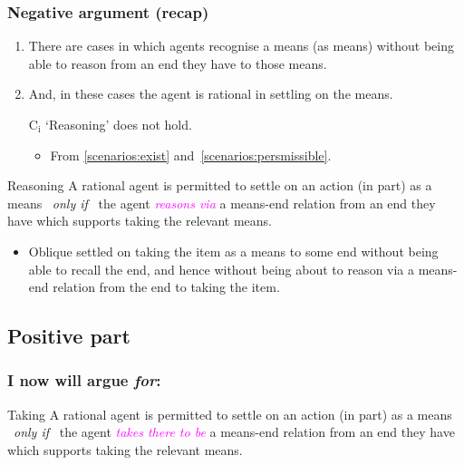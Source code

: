 \documentclass[noamssymb,
]{beamer} %
\newcommand{\hand}{\ding{43}}
\newcommand{\hozlinedash}[0]{
  \noindent\hdashrule[0.5ex][c]{\textwidth}{.1pt}{2.5pt}
}
\begin{document}
\begin{frame}
  \frametitle{Negative argument (recap)}

  \begin{enumerate}
  \item There are cases in which agents recognise a means (as means) without being able to reason from an end they have to those means.
  \item And, in these cases the agent is rational in settling on the means.

  \item[C\(_{\text{i}}\)] `Reasoning' does not hold.
    \begin{itemize}
    \item From \ref{scenarios:exist} and~\ref{scenarios:persmissible}.
    \end{itemize}
  \end{enumerate}

  \hozlinedash
  {\footnotesize
    \begin{block}{Reasoning}
      A rational agent is permitted to settle on an action (in part) as a means
      \newline
      \mbox{ }\hfill\emph{only if}\hfill\mbox{ }
      \newline
      the agent \textcolor{fuchsia}{\emph{reasons via}}  a means-end relation from an end they have which supports taking the relevant means.
    \end{block}
  }
  \begin{itemize}
  \item<2>[\hand] Oblique settled on taking the item as a means to some end without being able to recall the end, and hence without being about to reason via a means-end relation from the end to taking the item.
  \end{itemize}
\end{frame}

\subsection{Positive part}
\label{sec:positive}

\begin{frame}
  \frametitle{I now will argue \emph{for}:}

  \begin{block}{Taking}
    A rational agent is permitted to settle on an action (in part) as a means
    \newline
    \mbox{ }\hfill\emph{only if}\hfill\mbox{ }
    \newline
    the agent \textcolor{fuchsia}{\emph{takes there to be}} a means-end relation from an end they have which supports taking the relevant means.
  \end{block}
\end{frame}
\end{document}
